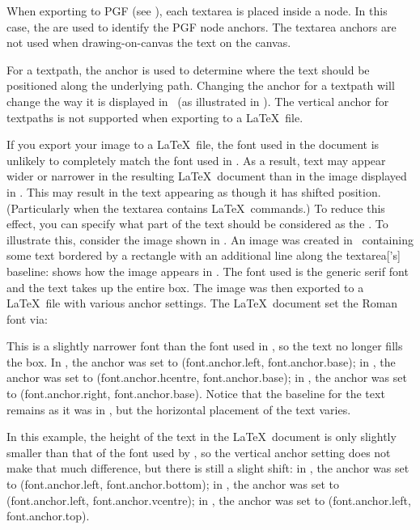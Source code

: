 When exporting to PGF (see ), each
\gls{textarea} is placed inside a node. In this case, the
 are used to identify the PGF node anchors.
The \gls{textarea} anchors are not used when \gls{drawing-on-canvas}
the text on the \gls{canvas}.

For a \gls{textpath}, the anchor is used to determine where the text
should be positioned along the underlying path. Changing the anchor
for a \gls*{textpath} will change the way it is displayed in
\FlowframTk\ (as illustrated in ).  The
vertical anchor for \glspl*{textpath} is not supported when
exporting to a \LaTeX\ file.

If you export your image to a \LaTeX\ file, the font used in the
document is unlikely to completely match the font used in \FlowframTk.
As a result, text may appear wider or narrower in the resulting
\LaTeX\ document than in the image displayed in \FlowframTk.  This may
result in the text appearing as though it has shifted position.
(Particularly when the \gls{textarea} contains \LaTeX\ commands.) To
reduce this effect, you can specify what part of the text should be
considered as the . To illustrate
this, consider the image shown in .  An image
was created in \FlowframTk\ containing some text bordered by a
rectangle with an additional line along the \gls*{textarea}['s]
baseline:  shows how the image appears
in \FlowframTk. The font used is the generic serif font and the
text takes up the entire box. The image was then exported to a
\LaTeX\ file with various anchor settings. The \LaTeX\ document set
the Roman font via:
\begin{compactcodebox}
\end{compactcodebox}

This is a slightly narrower font than the font used in \FlowframTk,
so the text no longer fills the box. In , the
anchor was set to (\gls{font.anchor.left}, \gls{font.anchor.base});
in , the anchor was set to
(\gls{font.anchor.hcentre}, \gls{font.anchor.base}); in
, the anchor was set to
(\gls{font.anchor.right}, \gls{font.anchor.base}).  Notice that the
baseline for the text remains as it was in \FlowframTk, but the
horizontal placement of the text varies.

In this example, the height of the text in the \LaTeX\ document is
only slightly smaller than that of the font used by \FlowframTk, so
the vertical anchor setting does not make that much difference, but
there is still a slight shift: in , the
anchor was set to (\gls{font.anchor.left},
\gls{font.anchor.bottom}); in , the anchor
was set to (\gls{font.anchor.left}, \gls{font.anchor.vcentre}); in
, the anchor was set to
(\gls{font.anchor.left}, \gls{font.anchor.top}).

